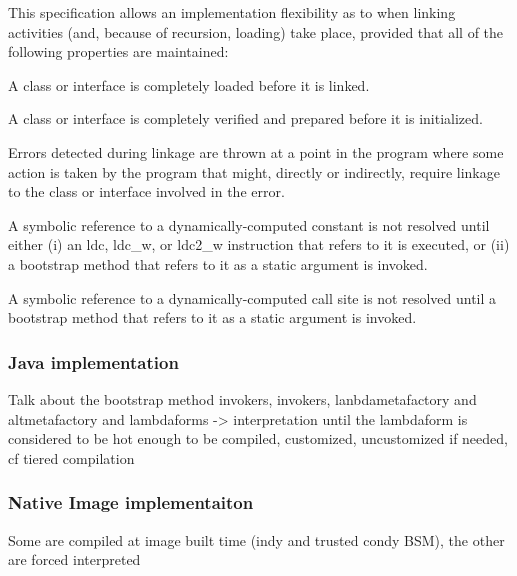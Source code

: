 This specification allows an implementation flexibility as to when linking activities (and, because of recursion, loading) take place, provided that all of the following properties are maintained:

    A class or interface is completely loaded before it is linked.

    A class or interface is completely verified and prepared before it is initialized.

    Errors detected during linkage are thrown at a point in the program where some action is taken by the program that might, directly or indirectly, require linkage to the class or interface involved in the error.

    A symbolic reference to a dynamically-computed constant is not resolved until either (i) an ldc, ldc_w, or ldc2_w instruction that refers to it is executed, or (ii) a bootstrap method that refers to it as a static argument is invoked.

    A symbolic reference to a dynamically-computed call site is not resolved until a bootstrap method that refers to it as a static argument is invoked.

\subsubsection{Java implementation}
Talk about the bootstrap method invokers, invokers, lanbdametafactory and altmetafactory and lambdaforms -> interpretation until the lambdaform is
considered to be hot enough to be compiled, customized, uncustomized if needed, cf tiered compilation
\subsubsection{Native Image implementaiton}
Some are compiled at image built time (indy and trusted condy BSM), the other are forced interpreted

